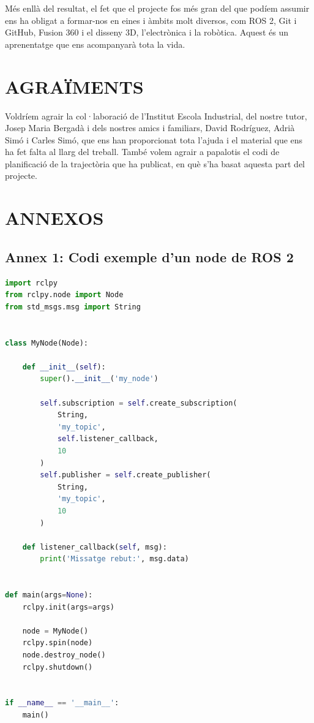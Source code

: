 \documentclass[11pt,a4paper]{article}
\let\origsection\section
\renewcommand{\section}{\clearpage\origsection}
\begin{document}
Més enllà del resultat, el fet que el projecte fos més gran del que podíem assumir ens ha obligat a formar-nos en eines i àmbits molt diversos, com ROS 2, Git i GitHub, Fusion 360 i el disseny 3D, l’electrònica i la robòtica. Aquest és un aprenentatge que ens acompanyarà tota la vida.

\section{AGRAÏMENTS}

Voldríem agrair la col·laboració de l’Institut Escola Industrial, del nostre tutor, Josep Maria Bergadà i dels nostres amics i familiars, David Rodríguez, Adrià Simó i Carles Simó, que ens han proporcionat tota l’ajuda i el material que ens ha fet falta al llarg del treball. També volem agrair a papalotis el codi de planificació de la trajectòria que ha publicat, en què s’ha basat aquesta part del projecte.

\clearpage
{}
{}
\section*{ANNEXOS}

{}
\subsection*{Annex 1: Codi exemple d'un node de ROS 2}\label{annex-1}

\begin{lstlisting}[language=Python]
import rclpy
from rclpy.node import Node
from std_msgs.msg import String


class MyNode(Node):

    def __init__(self):
        super().__init__('my_node')

        self.subscription = self.create_subscription(
            String,
            'my_topic',
            self.listener_callback,
            10
        )
        self.publisher = self.create_publisher(
            String,
            'my_topic',
            10
        )

    def listener_callback(self, msg):
        print('Missatge rebut:', msg.data)


def main(args=None):
    rclpy.init(args=args)

    node = MyNode()
    rclpy.spin(node)
    node.destroy_node()
    rclpy.shutdown()


if __name__ == '__main__':
    main()
\end{lstlisting}
\end{document}
